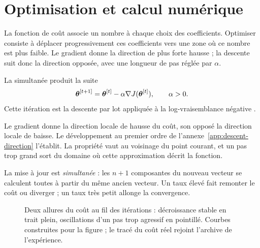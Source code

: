 \chapter{Optimisation et calcul numérique}
\label{ch:optim}

\begin{lecture}
La fonction de coût associe un nombre à chaque choix des coefficients. Optimiser
consiste à déplacer progressivement ces coefficients vers une zone où ce nombre
est plus faible. Le gradient donne la direction de plus forte hausse ; la
descente suit donc la direction opposée, avec une longueur de pas réglée par
$\alpha$.
\end{lecture}

La  simultanée produit la suite
\[
  \boldsymbol{\theta}^{[t+1]}=\boldsymbol{\theta}^{[t]}-\alpha\nabla J(\boldsymbol{\theta}^{[t]}),
  \qquad \alpha>0.
\]
Cette itération est la descente par lot appliquée à la
log-vraisemblance négative \cite[chap.~8]{boyd2004}.

Le gradient donne la direction locale de hausse du coût, son opposé la direction
locale de baisse. Le développement au premier ordre de
l'annexe~\ref{app:descent-direction} l'établit. La propriété vaut au voisinage du
point courant, et un pas trop grand sort du domaine où cette approximation décrit
la fonction.

La mise à jour est \emph{simultanée} : les $n+1$ composantes du nouveau vecteur
se calculent toutes à partir du même ancien vecteur. Un taux élevé fait remonter
le coût ou diverger ; un taux très petit allonge la convergence.

\begin{figure}[htbp]
  \centering
  \caption{Deux allures du coût au fil des itérations : décroissance stable en
  trait plein, oscillations d'un pas trop agressif en pointillé. Courbes
  construites pour la figure ; le tracé du coût réel rejoint l'archive de
  l'expérience.}
\end{figure}

